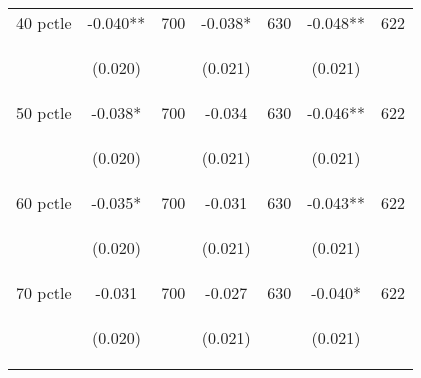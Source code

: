 \begin{tabular}{lcccccc}
40 pctle   &  -0.040**   &  700  &   -0.038*  &  630 &  -0.048**  &  622   \\

\vspace{4pt} &  \begin{footnotesize}(0.020)\end{footnotesize}   & &
			    \begin{footnotesize}(0.021)\end{footnotesize}   & &
			    \begin{footnotesize}(0.021)\end{footnotesize}   &
			     \\          

50 pctle   &  -0.038*   &  700  &   -0.034  &  630 &  -0.046**  &  622   \\

\vspace{4pt} &  \begin{footnotesize}(0.020)\end{footnotesize}   & &
			    \begin{footnotesize}(0.021)\end{footnotesize}   & &
			    \begin{footnotesize}(0.021)\end{footnotesize}   &
			     \\          

60 pctle   &  -0.035*   &  700  &   -0.031  &  630 &  -0.043**  &  622   \\


\vspace{4pt} &  \begin{footnotesize}(0.020)\end{footnotesize}   & &
			    \begin{footnotesize}(0.021)\end{footnotesize}   & &
			    \begin{footnotesize}(0.021)\end{footnotesize}   &
			     \\          

70 pctle   &  -0.031   &  700  &   -0.027  &  630 &  -0.040*  &  622   \\

\vspace{4pt} &  \begin{footnotesize}(0.020)\end{footnotesize}   & &
			    \begin{footnotesize}(0.021)\end{footnotesize}   & &
			    \begin{footnotesize}(0.021)\end{footnotesize}   &
			     \\          


\end{tabular}
